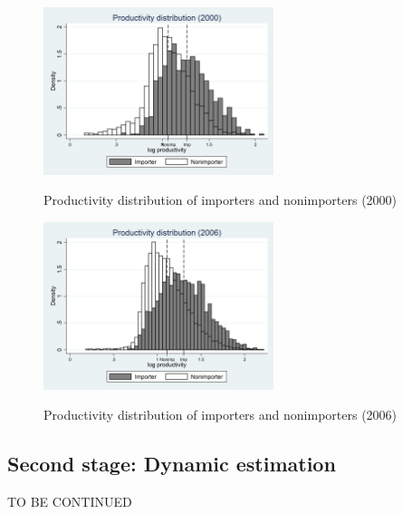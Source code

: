 \documentclass[11pt,letter]{article}
\begin{document}
\begin{appendices}
\begin{figure}[t]
\begin{center}
\caption{Productivity distribution of importers and nonimporters (2000)}
\includegraphics[width=0.6\textwidth]{prod_2000.png} 
\label{prod_2000}
\end{center}
\end{figure}


\begin{figure}[h]
\begin{center}
\caption{Productivity distribution of importers and nonimporters (2006)}
\includegraphics[width=0.6\textwidth]{prod_2006.png} 
\label{prod_2006}
\end{center}
\end{figure}

\subsection{Second stage: Dynamic estimation}

TO BE CONTINUED


\end{appendices}
\end{document}
